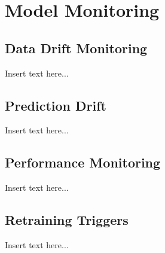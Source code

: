\section{Model Monitoring}

\subsection{Data Drift Monitoring}
Insert text here...

\subsection{Prediction Drift}
Insert text here...

\subsection{Performance Monitoring}
Insert text here...

\subsection{Retraining Triggers}
Insert text here...